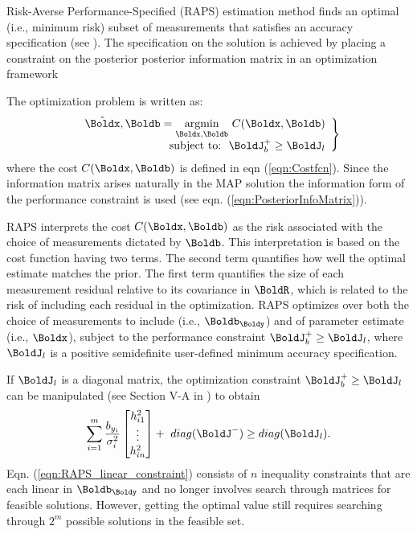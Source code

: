 Risk-Averse Performance-Specified (RAPS) estimation method finds an optimal (i.e.,  minimum risk) subset of measurements that satisfies an accuracy specification (see \cite{aghapour2018outlier}). The specification on the solution is achieved by placing a constraint on the posterior posterior information matrix in an optimization framework 

The optimization problem is written as:
\begin{equation} \label{eqn:RAPS_Problem}
	\left.
	\begin{array}{r}
	\hat{\Boldx}, \Boldb  = \underset{\Boldx,\Boldb}{\text{argmin}} ~ C(\Boldx,\Boldb)  \\ 
	\text{subject to:} \ \ \BoldJ_{b}^+ \ge \BoldJ_l 
	\end{array}
	\right\}
\end{equation}
where the cost $C(\Boldx,\Boldb)$ is defined in eqn (\ref{eqn:Costfcn}).
Since the information matrix arises naturally in the MAP solution the information form of the performance constraint is used (see eqn. (\ref{eqn:PosteriorInfoMatrix})).

RAPS interprets the cost $C(\Boldx,\Boldb)$ as the risk associated with the choice of measurements dictated by $\Boldb$.
This interpretation is based on the cost function having two terms.
The second term quantifies how well the optimal estimate matches the prior.
The first term quantifies the size of each measurement residual relative to its covariance in $\BoldR$, which is related to the risk of including each residual in the optimization.
RAPS optimizes over both the choice of measurements to include (i.e., $\Boldb_\Boldy$)  and of parameter estimate (i.e., $\Boldx$), subject to the performance constraint $\BoldJ_{b}^+ \ge \BoldJ_l$, where $\BoldJ_l$ is a positive semidefinite user-defined minimum accuracy specification. 

If $\BoldJ_l$ is a diagonal matrix, the optimization constraint $\BoldJ_{b}^+ \ge \BoldJ_l$ can be manipulated (see Section V-A in \cite{aghapour2019}) to obtain
\begin{equation} \label{eqn:RAPS_linear_constraint}
	\sum_{i=1}^{m} \frac{b_{y_i}}{\sigma_i^2} 
	\begin{bmatrix} h_{i1}^2 \\ \vdots \\ h_{in}^2	\end{bmatrix} 
	+ ~ diag(\BoldJ^{-})  \ge diag(\BoldJ_l).
\end{equation}
Eqn. (\ref{eqn:RAPS_linear_constraint}) consists of $n$ inequality constraints that are each linear in $\Boldb_{\Boldy}$ and no longer involves search through matrices for feasible solutions.
However, getting the optimal value still requires searching through $2^m$ possible solutions in the feasible set.


